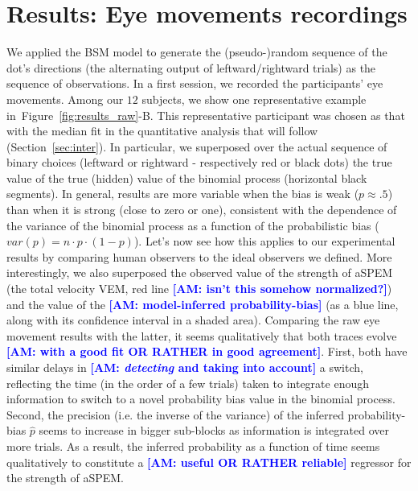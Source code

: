 \documentclass[12pt,english]{article}%
\newcommand{\seeFig}[1]{Figure~\ref{fig:#1}}
\newcommand{\seeSec}[1]{Section~\ref{sec:#1}}
\newcommand{\AM}[1]{\textbf{\textcolor{blue}{[AM: #1]}}}
\begin{document}
\section{Results: Eye movements recordings}
\label{sec:eye_rec}
We applied the BSM model
to generate the (pseudo-)random sequence of
the dot's directions (the alternating output of leftward/rightward trials)
as the sequence of observations.
In a first session, we recorded the participants' eye movements.
Among our $12$ subjects,
we show one representative example in~\seeFig{results_raw}-B.
This representative participant was chosen as that
with the median fit in the quantitative analysis
that will follow (\seeSec{inter}).
In particular, we superposed over the actual sequence of binary choices
(leftward or rightward - respectively red or black dots)
the true value of the true (hidden) value
of the binomial process (horizontal black segments).
In general, results are more variable when the bias is weak ($p\approx .5$)
than when it is strong (close to zero or one),
consistent with the dependence of the variance of the binomial process
as a function of the probabilistic bias ($var(p)=n\cdot p \cdot (1-p)$).
Let's now see how this applies to our experimental results
by comparing human observers to the ideal observers we defined.
More interestingly, we also superposed
the observed value of the strength of aSPEM
(the total velocity VEM, red line \AM{isn't this somehow normalized?})
and the value of the \AM{model-inferred probability-bias}
(as a blue line, along with its confidence interval in a shaded area).
Comparing the raw eye movement results with the latter,
it seems qualitatively that both traces evolve \AM{with a good fit OR RATHER in good agreement}.
First, both have similar delays in \AM{\emph{detecting} and taking into account} a switch,
reflecting the time (in the order of a few trials) taken to integrate enough information
to switch to a novel probability bias value in the binomial process.
Second, the precision (i.e. the inverse of the variance)
of the inferred probability-bias $\hat{p}$ seems to increase
in bigger sub-blocks as information is integrated over more trials.
As a result, the inferred probability as a function of time
seems qualitatively to constitute a \AM{useful OR RATHER reliable} regressor
for the strength of aSPEM.

\end{document}
